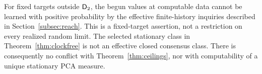 For fixed targets outside $\mathsf D_2$, the begun values at computable
data cannot be learned with positive probability by the effective
finite-history inquiries described in Section~\ref{subsec:reach}.
This is a fixed-target assertion, not a restriction on every
realized random limit. The selected stationary class in
Theorem~\ref{thm:clockfree} is not an effective closed consensus
class. There is consequently no conflict with
Theorem~\ref{thm:ceilings}, nor with computability of a unique
stationary PCA measure.
